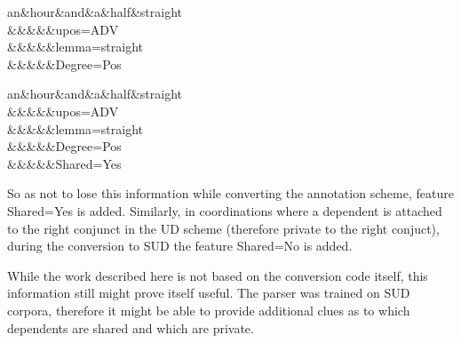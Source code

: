 \begin{exe}
    \ex
    \label{ex:UD 1,5h straight}
    \begin{dependency}[theme = simple]
        \begin{deptext}
            an\&hour\&and\&a\&half\&straight\\
            \&\&\&\&\&\footnotesize\textsf{upos=ADV}\\
            \&\&\&\&\&\footnotesize\textsf{lemma=straight}\\
            \&\&\&\&\&\footnotesize\textsf{Degree=Pos}\\
        \end{deptext}
    \end{dependency}
\end{exe}

\begin{exe}
    \ex
    \label{ex:SUD 1,5h straight}
    \begin{dependency}[theme = simple]
        \begin{deptext}
            an\&hour\&and\&a\&half\&straight\\
            \&\&\&\&\&\footnotesize\textsf{upos=ADV}\\
            \&\&\&\&\&\footnotesize\textsf{lemma=straight}\\
            \&\&\&\&\&\footnotesize\textsf{Degree=Pos}\\
            \&\&\&\&\&\footnotesize\textsf{Shared=Yes}\\
        \end{deptext}
    \end{dependency}
\end{exe}

So as not to lose this information while converting the annotation scheme, feature \textsf{Shared=Yes} is added. Similarly, in coordinations where a dependent is attached to the right conjunct in the UD scheme (therefore private to the right conjuct), during the conversion to SUD the feature \textsf{Shared=No} is added.

While the work described here is not based on the conversion code itself, this information still might prove itself useful. The parser was trained on SUD corpora, therefore it might be able to provide additional clues as to which dependents are shared and which are private. 

